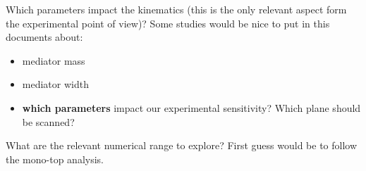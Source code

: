 

 Which parameters impact the kinematics (this is the only relevant aspect form the experimental point of view)? 
 Some studies would be nice to put in this documents about:
 \begin{itemize}
  \item mediator mass
  \item mediator width 
  \item \textbf{which parameters} impact our experimental sensitivity? Which plane should be scanned?
 \end{itemize}

 What are the relevant numerical range to explore? First guess would be to follow the mono-top analysis.
